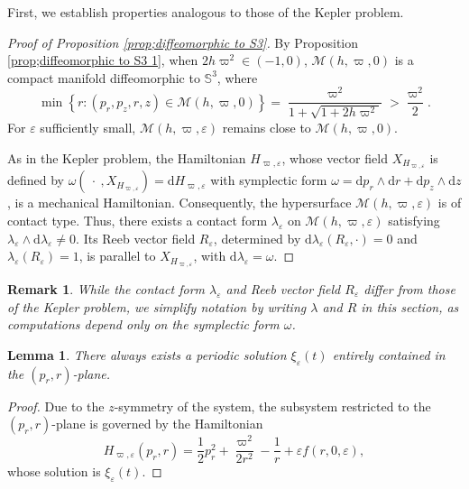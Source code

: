 \documentclass[11pt]{amsart}
\newcommand{\ep}{\varepsilon}
\newcommand{\om}{\varpi}
\newtheorem{lemma}{Lemma}[section]
\newtheorem{remark}{Remark}[section]
\begin{document}
First, we establish properties analogous to those of the Kepler problem.  

\begin{proof}[Proof of Proposition \ref{prop;diffeomorphic to S3}] 
	By Proposition \ref{prop;diffeomorphic to S3 1}, when $ 2h\om^2 \in (-1, 0) $, $ \mathcal{M}(h, \om, 0) $ is a compact manifold diffeomorphic to $ \mathbb{S}^3 $, where  
	$$
	\min\left\{ r : (p_r, p_z, r, z) \in \mathcal{M}(h, \om, 0) \right\} = \frac{\om^2}{1 + \sqrt{1 + 2h\om^2}} > \frac{\om^2}{2}.  
	$$ 
	For $ \ep $ sufficiently small, $ \mathcal{M}(h, \om, \ep) $ remains close to $ \mathcal{M}(h, \om, 0) $.
	 
	As in the Kepler problem, the Hamiltonian $H_{\om,\ep}$, whose vector field $X_{H_{\om,\ep}}$ is defined by $ \omega(\ \cdot\ , X_{H_{\om,\ep}}) = \mathrm{d} H_{\om,\ep} $ with symplectic form $ \omega = \mathrm{d}p_r \wedge \mathrm{d}r + \mathrm{d}p_z \wedge \mathrm{d}z $, is a mechanical Hamiltonian. Consequently, the hypersurface $ \mathcal{M}(h, \om, \ep) $ is of contact type. Thus, there exists a contact form $ \lambda_{\ep} $ on $ \mathcal{M}(h, \om, \ep) $ satisfying $ \lambda_{\ep} \wedge \mathrm{d}\lambda_{\ep} \neq 0 $. Its Reeb vector field $ R_{\ep} $, determined by $ \mathrm{d}\lambda_{\ep}(R_{\ep}, \cdot) = 0 $ and $ \lambda_{\ep}(R_{\ep}) = 1 $, is parallel to $ X_{H_{\om,\ep}} $, with $ \mathrm{d}\lambda_{\ep} = \omega $. 
\end{proof}

\begin{remark}  
	While the contact form $ \lambda_{\ep} $ and Reeb vector field $ R_{\ep} $ differ from those of the Kepler problem, we simplify notation by writing $ \lambda $ and $ R $ in this section, as computations depend only on the symplectic form $ \omega $.  
\end{remark}  


\begin{lemma}
\label{lem:xi-r-ep} There always exists a periodic solution $ \xi_{\ep}(t) $ entirely contained in the $ (p_r, r) $-plane.
\end{lemma}

\begin{proof}
Due to the $ z $-symmetry of the system, the subsystem restricted to the $ (p_r, r) $-plane is governed by the Hamiltonian  
$$
H_{\om,\ep}(p_r, r) = \frac{1}{2}p_r^2 + \frac{\om^2}{2r^2} - \frac{1}{r} + \ep f(r, 0, \ep),  
$$  
whose solution is $ \xi_{\ep}(t) $.
\end{proof}
 
\end{document}
